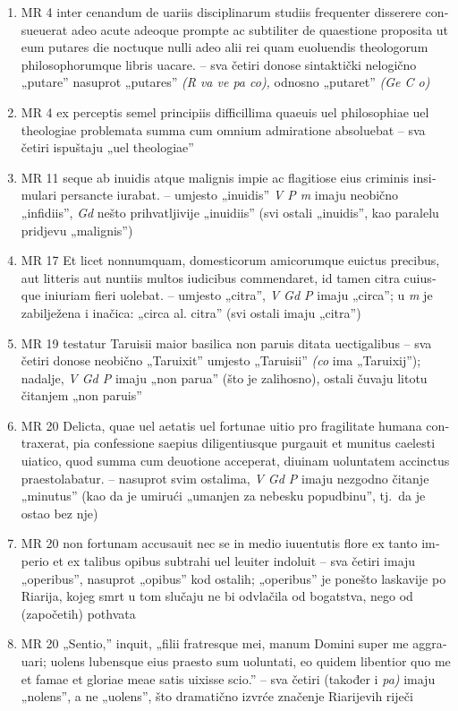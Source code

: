 \documentclass[a5paper,twoside]{article}
\begin{document}
\begin{enumerate}[label=\alph*)]
\item MR 4 \textlatin{inter cenandum de uariis disciplinarum studiis frequenter disserere consueuerat adeo acute adeoque prompte ac subtiliter de quaestione proposita ut eum putares die noctuque nulli adeo alii rei quam euoluendis theologorum philosophorumque libris uacare.} – sva četiri donose sintaktički nelogično „putare” nasuprot „putares” \textit{(R va ve pa co),} odnosno „putaret” \textit{(Ge C o)}
\item MR 4 \textlatin{ex perceptis semel principiis difficillima quaeuis uel philosophiae uel theologiae problemata summa cum omnium admiratione absoluebat} – sva četiri ispuštaju „uel theologiae”
\item MR 11 \textlatin{seque ab inuidis atque malignis impie ac flagitiose eius criminis insimulari persancte iurabat.} – umjesto „inuidis” \textit{V P m} imaju neobično „infidiis”, \textit{Gd} nešto prihvatljivije „inuidiis” (svi ostali „inuidis”, kao paralelu pridjevu „malignis”)
\item MR 17 \textlatin{Et licet nonnumquam, domesticorum amicorumque euictus precibus, aut litteris aut nuntiis multos iudicibus commendaret, id tamen citra cuiusque iniuriam fieri uolebat.} – umjesto „citra”, \textit{V Gd P} imaju „circa”; u \textit{m} je zabilježena i inačica: „circa al. citra” (svi ostali imaju „citra”)
\item MR 19 \textlatin{testatur Taruisii maior basilica non paruis ditata uectigalibus} – sva četiri donose neobično „Taruixit” umjesto „Taruisii” \textit{(co} ima „Taruixij”); nadalje, \textit{V Gd P} imaju „non parua” (što je zalihosno), ostali čuvaju litotu čitanjem „non paruis”
\item MR 20 \textlatin{Delicta, quae uel aetatis uel fortunae uitio pro fragilitate humana contraxerat, pia confessione saepius diligentiusque purgauit et munitus caelesti uiatico, quod summa cum deuotione acceperat, diuinam uoluntatem accinctus praestolabatur.} – nasuprot svim ostalima, \textit{V Gd P} imaju nezgodno čitanje „minutus” (kao da je umirući „umanjen za nebesku popudbinu”, tj.\ da je ostao bez nje)
\item MR 20 \textlatin{non fortunam accusauit nec se in medio iuuentutis flore ex tanto imperio et ex talibus opibus subtrahi uel leuiter indoluit} – sva četiri imaju „operibus”, nasuprot „opibus” kod ostalih; „operibus” je ponešto laskavije po Riarija, kojeg smrt u tom slučaju ne bi odvlačila od bogatstva, nego od (započetih) pothvata
\item MR 20 \textlatin{„Sentio,” inquit, „filii fratresque mei, manum Domini super me aggrauari; uolens lubensque eius praesto sum uoluntati, eo quidem libentior quo me et famae et gloriae meae satis uixisse scio.”} – sva četiri (također i \textit{pa)} imaju „nolens”, a ne „uolens”, što dramatično izvrće značenje Riarijevih riječi
\end{enumerate}
\end{document}
